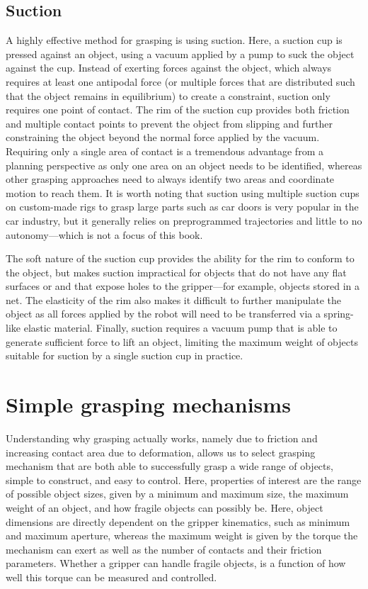 \subsection{Suction}

A highly effective method for grasping is using suction. Here, a suction cup is pressed against an object, using a vacuum applied by a pump to suck the object against the cup. Instead of exerting forces against the object, which always requires at least one antipodal force (or multiple forces that are distributed such that the object remains in equilibrium) to create a constraint, suction only requires one point of contact. The rim of the suction cup provides both friction and multiple contact points to prevent the object from slipping and further constraining the object beyond the normal force applied by the vacuum.
Requiring only a single area of contact is a tremendous advantage from a planning perspective as only one area on an object needs to be identified, whereas other grasping approaches need to always identify two areas and coordinate motion to reach them.
It is worth noting that suction using multiple suction cups on custom-made rigs to grasp large parts such as car doors is very popular in the car industry, but it generally relies on preprogrammed trajectories and little to no autonomy---which is not a focus of this book.

The soft nature of the suction cup provides the ability for the rim to conform to the object, but makes suction impractical for objects that do not have any flat surfaces or and that expose holes to the gripper---for example, objects stored in a net. The elasticity of the rim also makes it difficult to further manipulate the object as all forces applied by the robot will need to be transferred via a spring-like elastic material. Finally, suction requires a vacuum pump that is able to generate sufficient force to lift an object, limiting the maximum weight of objects suitable for suction by a single suction cup in practice.

\section{Simple grasping mechanisms}\label{sec:simplegrasp}

Understanding why grasping actually works, namely due to friction and increasing contact area due to deformation, allows us to select grasping mechanism that are both able to successfully grasp a wide range of objects, simple to construct, and easy to control. Here, properties of interest are the range of possible object sizes, given by a minimum and maximum size, the maximum weight of an object, and how fragile objects can possibly be. Here, object dimensions are directly dependent on the gripper kinematics, such as minimum and maximum aperture, whereas the maximum weight is given by the torque the mechanism can exert as well as the number of contacts and their friction parameters. Whether a gripper can handle fragile objects, is a function of how well this torque can be measured and controlled.

